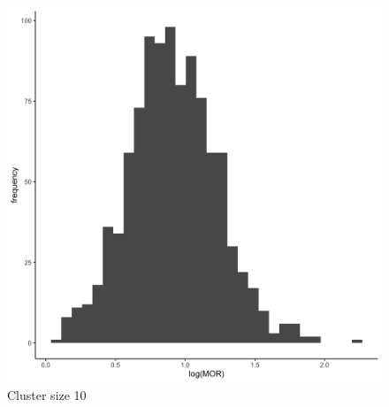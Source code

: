 \documentclass[
  letterpaper,
  DIV=11,
  numbers=noendperiod,
  titlepage]{scrartcl}
\begin{document}
\begin{figure}
\begin{minipage}[t]{0.24\linewidth}
{{\includegraphics{../../plots/two-lvl-ran-slope/high-prev/hist_30_10_two_lvl_slp_high_prev_q2.png}

}

\caption{Cluster size 10}

}

\end{minipage}%
%
\begin{minipage}[t]{0.24\linewidth}

{\centering 

}
\end{minipage}
\end{figure}
\end{document}
